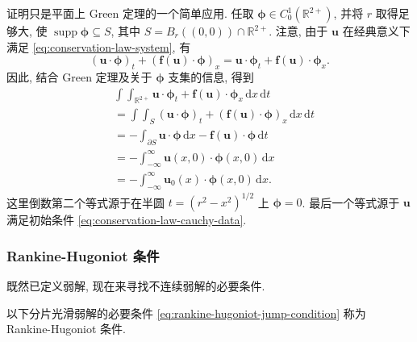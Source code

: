 \begin{Proof}
证明只是平面上 Green 定理的一个简单应用. 任取 $\bm{\phi}\in C_0^1(\mathbb{R}^{2+})$, 并将 $r$ 取得足够大, 使 $\operatorname{supp}\bm{\phi}\subseteq S$, 其中 $S=B_r((0,0))\cap\mathbb{R}^{2+}$. 注意, 由于 $\bm{u}$ 在经典意义下满足 \eqref{eq:conservation-law-system}, 有
\begin{equation}\label{eq:conservation-classical-product-identity}
(\bm{u}\cdot\bm{\phi})_t+(\bm{f}(\bm{u})\cdot\bm{\phi})_x=\bm{u}\cdot\bm{\phi}_t+\bm{f}(\bm{u})\cdot\bm{\phi}_x.
\end{equation}
因此, 结合 Green 定理及关于 $\bm{\phi}$ 支集的信息, 得到
\[
\begin{aligned}
&\int\!\!\int_{\mathbb{R}^{2+}}\bm{u}\cdot\bm{\phi}_t+\bm{f}(\bm{u})\cdot\bm{\phi}_x\,\mathrm{d}x\,\mathrm{d}t\\
&=\int\!\!\int_S(\bm{u}\cdot\bm{\phi})_t+(\bm{f}(\bm{u})\cdot\bm{\phi})_x\,\mathrm{d}x\,\mathrm{d}t\\
&=-\int_{\partial S}\bm{u}\cdot\bm{\phi}\,\mathrm{d}x-\bm{f}(\bm{u})\cdot\bm{\phi}\,\mathrm{d}t\\
&=-\int_{-\infty}^\infty\bm{u}(x,0)\cdot\bm{\phi}(x,0)\,\mathrm{d}x\\
&=-\int_{-\infty}^\infty\bm{u}_0(x)\cdot\bm{\phi}(x,0)\,\mathrm{d}x.
\end{aligned}
\]
这里倒数第二个等式源于在半圆 $t=(r^2-x^2)^{1/2}$ 上 $\bm{\phi}=0$. 最后一个等式源于 $\bm{u}$ 满足初始条件 \eqref{eq:conservation-law-cauchy-data}.
\end{Proof}

\subsubsection{Rankine-Hugoniot 条件}\label{subsec:rankine-hugoniot-condition}

既然已定义弱解, 现在来寻找不连续弱解的必要条件.

以下分片光滑弱解的必要条件 \eqref{eq:rankine-hugoniot-jump-condition} 称为 Rankine-Hugoniot 条件.

